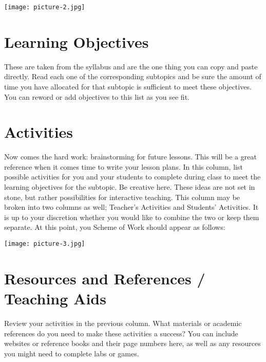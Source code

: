 \begin{flushleft}
\texttt{[image: picture-2.jpg]} 
\end{flushleft}

\section{Learning Objectives}
These are taken from the syllabus and are the one thing you can copy and paste directly.  Read each one of the corresponding subtopics and be sure the amount of time you have allocated for that subtopic is sufficient to meet these objectives.  You can reword or add objectives to this list as you see fit.

\section{Activities}
Now comes the hard work: brainstorming for future lessons.  This will be a great reference when it comes time to write your lesson plans.  In this column, list possible activities for you and your students to complete during class to meet the learning objectives for the subtopic.  Be creative here.  These ideas are not set in stone, but rather possibilities for interactive teaching.  This column may be broken into two columns as well; Teacher's Activities and Students' Activities. It is up to your discretion whether you would like to combine the two or keep them separate. At this point, you Scheme of Work should appear as follows:

\begin{flushleft}
\texttt{[image: picture-3.jpg]} 
\end{flushleft}

\section{Resources and References / Teaching Aids}
Review your activities in the previous column.  What materials or academic references do you need to make these activities a success?  You can include websites or reference books and their page numbers here, as well as any resources you might need to complete labs or games.

